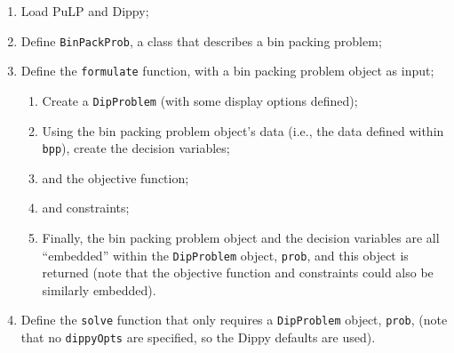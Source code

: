\begin{enumerate}[leftmargin=0cm,itemindent=0.75cm,labelwidth=.5cm,labelsep=.25cm,labelindent=0cm,align=left]
\item Load PuLP and Dippy;


\item Define \lstinline{BinPackProb}, a class that describes a bin packing problem;


\item Define the \lstinline{formulate} function, with a bin packing problem object as input;
\begin{enumerate}[leftmargin=0cm,itemindent=0.75cm,labelwidth=.5cm,labelsep=.25cm,labelindent=0cm,align=left]
\item Create a \lstinline{DipProblem} (with some display options defined);


\item Using the bin packing problem object's data (i.e., the data defined within \lstinline{bpp}), create the decision variables;

\item and the objective function;

\item and constraints;


\vspace*{1cm} %

\item Finally, the bin packing problem object and the decision variables are all ``embedded'' within the \lstinline{DipProblem} object, \lstinline{prob}, and this object is returned (note that the objective function and constraints could also be similarly embedded).

\end{enumerate}

\item Define the \lstinline{solve} function that only requires a \lstinline{DipProblem} object, \lstinline{prob}, (note that no \lstinline{dippyOpts} are specified, so the Dippy defaults are used).


\end{enumerate}

